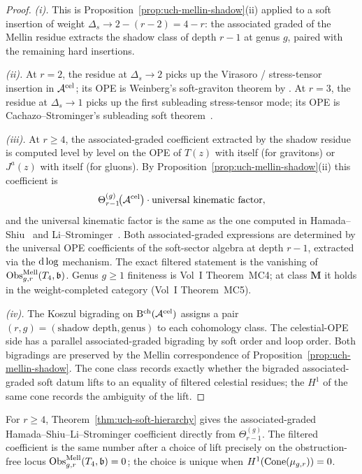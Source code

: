 \begin{proof}
\emph{(i).}
This is Proposition~\ref{prop:uch-mellin-shadow}(ii) applied to a
soft insertion of weight $\Delta_s \to 2 - (r-2) = 4 - r$: the
associated graded of the Mellin residue extracts the shadow class of
depth $r-1$ at genus $g$, paired with the remaining hard insertions.

\emph{(ii).}
At $r = 2$, the residue at $\Delta_s \to 2$ picks up the
Virasoro / stress-tensor insertion in $\mathcal A^{\mathrm{cel}}$;
its OPE is Weinberg's soft-graviton theorem by
\cite{DonnayFotopoulosPasterskiTaylor21, StromingerLectures2018}. At
$r = 3$, the residue at $\Delta_s \to 1$ picks up the first
subleading stress-tensor mode; its OPE is Cachazo--Strominger's
subleading soft theorem~\cite{CachazoStrominger14}.

\emph{(iii).}
At $r \geq 4$, the associated-graded coefficient extracted by the
shadow residue is computed level by level on the OPE of $T(z)$ with
itself (for gravitons) or $J^a(z)$ with itself (for gluons). By
Proposition~\ref{prop:uch-mellin-shadow}(ii) this coefficient is
\[
\Theta_{r-1}^{(g)}\!\bigl(\mathcal A^{\mathrm{cel}}\bigr)
\cdot
\text{universal kinematic factor},
\]
and the universal kinematic factor is the same as the one computed
in Hamada--Shiu~\cite[(3.12)]{HamadaShiuSubsubSoft} and
Li--Strominger~\cite[\S 4]{LiStromingerHigherSoft}. Both
associated-graded expressions are determined by the universal OPE
coefficients of the soft-sector algebra at depth $r-1$, extracted via
the $\mathrm d\log$ mechanism. The exact filtered statement is the vanishing
of $\operatorname{Obs}^{\mathrm{Mell}}_{g,r}(T_4,\mathfrak b)$. Genus
$g \geq 1$ finiteness is Vol~I Theorem~MC4; at class $\mathbf M$ it
holds in the weight-completed category (Vol~I Theorem~MC5).

\emph{(iv).}
The Koszul bigrading on $\mathrm B^{\mathrm{ch}}(\mathcal A^{\mathrm{cel}})$ assigns a pair
$(r, g) = (\text{shadow depth}, \text{genus})$ to each cohomology
class. The celestial-OPE side has a parallel associated-graded
bigrading by soft order and loop order. Both bigradings are preserved
by the Mellin correspondence of Proposition~\ref{prop:uch-mellin-shadow}.
The cone class records exactly whether the bigraded associated-graded
soft datum lifts to an equality of filtered celestial residues; the
$H^1$ of the same cone records the ambiguity of the lift.
\end{proof}

\begin{remark}
\label{rem:uch-fm103-resolution}
For $r\geq 4$, Theorem~\ref{thm:uch-soft-hierarchy} gives the
associated-graded Hamada--Shiu--Li--Strominger coefficient directly
from $\Theta^{(g)}_{r-1}$. The filtered coefficient is the same
number after a choice of lift precisely on the obstruction-free locus
$\operatorname{Obs}^{\mathrm{Mell}}_{g,r}(T_4,\mathfrak b)=0$; the choice is unique
when $H^1(\operatorname{Cone}(\mu_{g,r}))=0$.
\end{remark}

